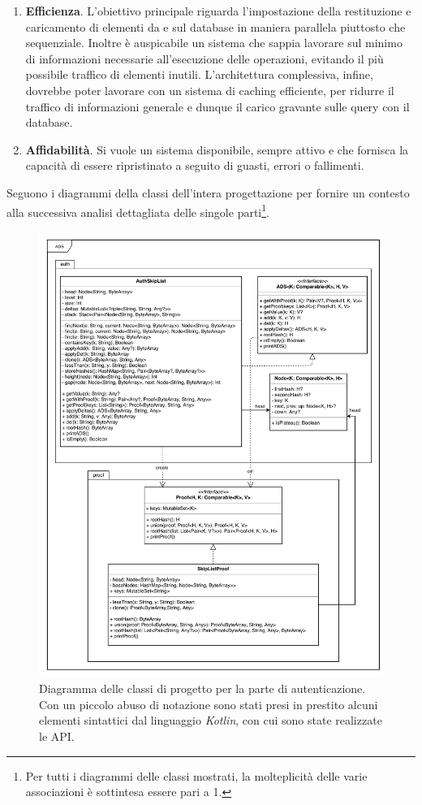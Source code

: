 	\begin{enumerate}
		\item \textbf{Efficienza}. L'obiettivo principale riguarda l'impostazione della restituzione e caricamento di elementi da e sul database in maniera parallela piuttosto che sequenziale. Inoltre è auspicabile un sistema che sappia lavorare sul minimo di informazioni necessarie all'esecuzione delle operazioni, evitando il più possibile traffico di elementi inutili. L'architettura complessiva, infine, dovrebbe poter lavorare con un sistema di caching efficiente, per ridurre il traffico di informazioni generale e dunque il carico gravante sulle query con il database.
		\item \textbf{Affidabilità}. Si vuole un sistema disponibile, sempre attivo e che fornisca la capacità di essere ripristinato a seguito di guasti, errori o fallimenti.
	\end{enumerate}

	Seguono i diagrammi della classi dell'intera progettazione per fornire un contesto alla successiva analisi dettagliata delle singole parti\footnote{Per tutti i diagrammi delle classi mostrati, la molteplicità delle varie associazioni è sottintesa essere pari a 1.}.

	\begin{figure}
		\centering
		\includegraphics[scale=0.65]{figure/Auth+Proof.pdf}
		\caption{Diagramma delle classi di progetto per la parte di autenticazione. Con un piccolo abuso di notazione sono stati presi in prestito alcuni elementi sintattici dal linguaggio \textit{Kotlin}, con cui sono state realizzate le API.}\label{fig:authDCD}
	\end{figure}

